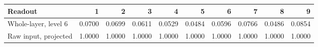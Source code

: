 \begin{tabular}{lrrrrrrrrr}
\toprule
Readout & 1 & 2 & 3 & 4 & 5 & 6 & 7 & 8 & 9 \\
\midrule
Whole-layer, level 6 & 0.0700 & 0.0699 & 0.0611 & 0.0529 & 0.0484 & 0.0596 & 0.0766 & 0.0486 & 0.0854 \\
Raw input, projected & 1.0000 & 1.0000 & 1.0000 & 1.0000 & 1.0000 & 1.0000 & 1.0000 & 1.0000 & 1.0000 \\
\bottomrule
\end{tabular}
